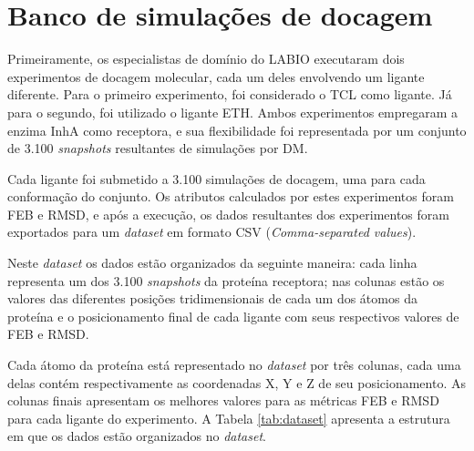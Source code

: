 \section{Banco de simulações de docagem}

Primeiramente, os especialistas de domínio do LABIO executaram dois experimentos de docagem molecular, cada um deles envolvendo um ligante diferente. Para o primeiro experimento, foi considerado o TCL como ligante. Já para o segundo, foi utilizado o ligante ETH. Ambos experimentos empregaram a enzima InhA como receptora, e sua flexibilidade foi representada por um conjunto de 3.100 \emph{snapshots} resultantes de simulações por DM. 

Cada ligante foi submetido a 3.100 simulações de docagem, uma para cada conformação do conjunto. Os atributos calculados por estes experimentos foram FEB e RMSD, e após a execução, os dados resultantes dos experimentos foram exportados para um \emph{dataset} em formato CSV (\emph{Comma-separated values}).

Neste \emph{dataset} os dados estão organizados da seguinte maneira: cada linha representa um dos 3.100 \emph{snapshots} da proteína receptora; nas colunas estão os valores das diferentes posições tridimensionais de cada um dos átomos da proteína e o posicionamento final de cada ligante com seus respectivos valores de FEB e RMSD.

Cada átomo da proteína está representado no \emph{dataset} por três colunas, cada uma delas contém respectivamente as coordenadas X, Y e Z de seu posicionamento. As colunas finais apresentam os melhores valores para as métricas FEB e RMSD para cada ligante do experimento. A Tabela \ref{tab:dataset} apresenta a estrutura em que os dados estão organizados no \emph{dataset}.

